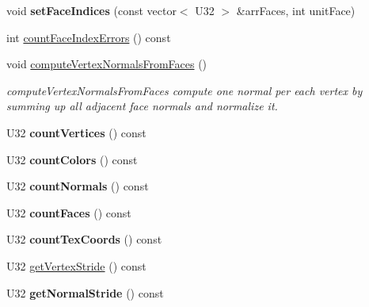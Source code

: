 \begin{DoxyCompactItemize}
\item 
\hypertarget{classps_1_1scene_1_1MeshNode_afcd2c042b979b2275880054b77b79a9c}{}void {\bfseries set\+Face\+Indices} (const vector$<$ U32 $>$ \&arr\+Faces, int unit\+Face)\label{classps_1_1scene_1_1MeshNode_afcd2c042b979b2275880054b77b79a9c}

\item 
int \hyperlink{classps_1_1scene_1_1MeshNode_a5ae2786a600ec3a343b0d848da121842}{count\+Face\+Index\+Errors} () const 
\item 
\hypertarget{classps_1_1scene_1_1MeshNode_ae776587abb773e23135a99ea2a5edf1b}{}void \hyperlink{classps_1_1scene_1_1MeshNode_ae776587abb773e23135a99ea2a5edf1b}{compute\+Vertex\+Normals\+From\+Faces} ()\label{classps_1_1scene_1_1MeshNode_ae776587abb773e23135a99ea2a5edf1b}

\begin{DoxyCompactList}\small\item\em compute\+Vertex\+Normals\+From\+Faces compute one normal per each vertex by summing up all adjacent face normals and normalize it. \end{DoxyCompactList}\item 
\hypertarget{classps_1_1scene_1_1MeshNode_a985cb7e99f593a7f30da05ab0539bed1}{}U32 {\bfseries count\+Vertices} () const \label{classps_1_1scene_1_1MeshNode_a985cb7e99f593a7f30da05ab0539bed1}

\item 
\hypertarget{classps_1_1scene_1_1MeshNode_aba0879a4d3bb3322b2d8b6ccd06a9066}{}U32 {\bfseries count\+Colors} () const \label{classps_1_1scene_1_1MeshNode_aba0879a4d3bb3322b2d8b6ccd06a9066}

\item 
\hypertarget{classps_1_1scene_1_1MeshNode_a1db603a096bc9262969ae7c5367a5edb}{}U32 {\bfseries count\+Normals} () const \label{classps_1_1scene_1_1MeshNode_a1db603a096bc9262969ae7c5367a5edb}

\item 
\hypertarget{classps_1_1scene_1_1MeshNode_af3fae6362d64ff0415da2f5544209e17}{}U32 {\bfseries count\+Faces} () const \label{classps_1_1scene_1_1MeshNode_af3fae6362d64ff0415da2f5544209e17}

\item 
\hypertarget{classps_1_1scene_1_1MeshNode_ab49145c691c1895f8ff22541f9647324}{}U32 {\bfseries count\+Tex\+Coords} () const \label{classps_1_1scene_1_1MeshNode_ab49145c691c1895f8ff22541f9647324}

\item 
U32 \hyperlink{classps_1_1scene_1_1MeshNode_aa3ac3b3ac130454dba6d2507a47e1586}{get\+Vertex\+Stride} () const 
\item 
\hypertarget{classps_1_1scene_1_1MeshNode_ad1a9aeeaf8b1d54916ab73669ca05f03}{}U32 {\bfseries get\+Normal\+Stride} () const \label{classps_1_1scene_1_1MeshNode_ad1a9aeeaf8b1d54916ab73669ca05f03}


\end{DoxyCompactItemize}
